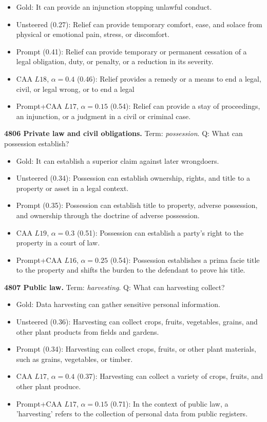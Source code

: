 \begin{itemize}\setlength{\itemsep}{0.15em}\setlength{\parsep}{0pt}\setlength{\topsep}{0.2em}
\item Gold: It can provide an injunction stopping unlawful conduct.
\item Unsteered (0.27): Relief can provide temporary comfort, ease, and solace from physical or emotional pain, stress, or discomfort.
\item Prompt (0.41): Relief can provide temporary or permanent cessation of a legal obligation, duty, or penalty, or a reduction in its severity.
\item CAA $L18$, $\alpha=0.4$ (0.46): Relief provides a remedy or a means to end a legal, civil, or legal wrong, or to end a legal
\item Prompt+CAA $L17$, $\alpha=0.15$ (0.54): Relief can provide a stay of proceedings, an injunction, or a judgment in a civil or criminal case.
\end{itemize}
\medskip\noindent\textbf{4806 Private law and civil obligations.} Term: \emph{possession}.
Q: What can possession establish?
\begin{itemize}\setlength{\itemsep}{0.15em}\setlength{\parsep}{0pt}\setlength{\topsep}{0.2em}
\item Gold: It can establish a superior claim against later wrongdoers.
\item Unsteered (0.34): Possession can establish ownership, rights, and title to a property or asset in a legal context.
\item Prompt (0.35): Possession can establish title to property, adverse possession, and ownership through the doctrine of adverse possession.
\item CAA $L19$, $\alpha=0.3$ (0.51): Possession can establish a party's right to the property in a court of law.
\item Prompt+CAA $L16$, $\alpha=0.25$ (0.54): Possession establishes a prima facie title to the property and shifts the burden to the defendant to prove his title.
\end{itemize}
\medskip\noindent\textbf{4807 Public law.} Term: \emph{harvesting}.
Q: What can harvesting collect?
\begin{itemize}\setlength{\itemsep}{0.15em}\setlength{\parsep}{0pt}\setlength{\topsep}{0.2em}
\item Gold: Data harvesting can gather sensitive personal information.
\item Unsteered (0.36): Harvesting can collect crops, fruits, vegetables, grains, and other plant products from fields and gardens.
\item Prompt (0.34): Harvesting can collect crops, fruits, or other plant materials, such as grains, vegetables, or timber.
\item CAA $L17$, $\alpha=0.4$ (0.37): Harvesting can collect a variety of crops, fruits, and other plant produce.
\item Prompt+CAA $L17$, $\alpha=0.15$ (0.71): In the context of public law, a 'harvesting' refers to the collection of personal data from public registers.
\end{itemize}
